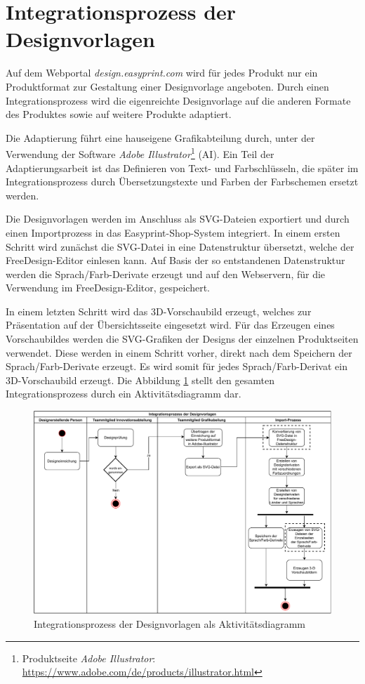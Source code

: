 \section{Integrationsprozess der Designvorlagen}
\label{sect:Integrationsprozess_Designvorlagen}
Auf dem Webportal \emph{design.easyprint.com} wird für jedes Produkt nur ein Produktformat zur Gestaltung einer Designvorlage angeboten. Durch einen Integrationsprozess wird die eigenreichte Designvorlage auf die anderen Formate des Produktes sowie auf weitere Produkte adaptiert.

Die Adaptierung führt eine hauseigene Grafikabteilung durch, unter der Verwendung der Software \emph{Adobe Illustrator}\footnote{Produktseite \emph{Adobe Illustrator}: \url{https://www.adobe.com/de/products/illustrator.html}} (AI). 
Ein Teil der Adaptierungsarbeit ist das Definieren von Text- und Farbschlüsseln, die später im Integrationsprozess durch Übersetzungstexte und Farben der Farbschemen ersetzt werden. 

Die Designvorlagen werden im Anschluss als SVG-Dateien exportiert und durch einen Importprozess in das Easyprint-Shop-System integriert. 
In einem ersten Schritt wird zunächst die SVG-Datei in eine Datenstruktur übersetzt, welche der FreeDesign-Editor einlesen kann. Auf Basis der so entstandenen  
Datenstruktur werden die Sprach/Farb-Derivate erzeugt und auf den Webservern, für die Verwendung im FreeDesign-Editor, gespeichert.  

In einem letzten Schritt wird das 3D-Vorschaubild erzeugt, welches zur Präsentation auf der Übersichtsseite eingesetzt wird. Für das Erzeugen eines Vorschaubildes werden die SVG-Grafiken der Designs der einzelnen Produktseiten verwendet. 
Diese werden in einem Schritt vorher, direkt nach dem Speichern der Sprach/Farb-Derivate erzeugt. Es wird somit für jedes Sprach/Farb-Derivat ein 3D-Vorschaubild erzeugt.
Die Abbildung \ref{fig:Vorlagenimport} stellt den gesamten Integrationsprozess durch ein Aktivitätsdiagramm dar.

\begin{figure}[H]
    \centering
    \includegraphics[width=.98\textwidth]{diagrams/FreeDesign-Vorlagenerstellung.pdf}
\caption{Integrationsprozess der Designvorlagen als Aktivitätsdiagramm}
\label{fig:Vorlagenimport}
\end{figure}

